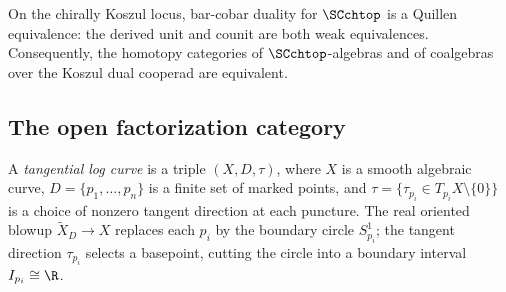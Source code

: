 \begin{corollary}
\label{cor:quillen-equivalence}
On the chirally Koszul locus, bar-cobar duality for $\SCchtop$
is a Quillen equivalence: the derived unit and counit are both
weak equivalences. Consequently, the homotopy categories of
$\SCchtop$-algebras and of coalgebras over the Koszul dual
cooperad are equivalent.
\end{corollary}

\subsection{The open factorization category}
\label{subsec:open-factorization-category}

\begin{definition}
\label{def:tangential-log-curve-v2}
A \emph{tangential log curve} is a triple $(X, D, \tau)$, where
$X$ is a smooth algebraic curve, $D = \{p_1, \ldots, p_n\}$ is a
finite set of marked points, and
$\tau = \{\tau_{p_i} \in T_{p_i} X \setminus \{0\}\}$ is a choice
of nonzero tangent direction at each puncture.
The real oriented blowup $\widetilde{X}_D \to X$ replaces each
$p_i$ by the boundary circle $S^1_{p_i}$; the tangent direction
$\tau_{p_i}$ selects a basepoint, cutting the circle into a
boundary interval $I_{p_i} \cong \R$.
\end{definition}

